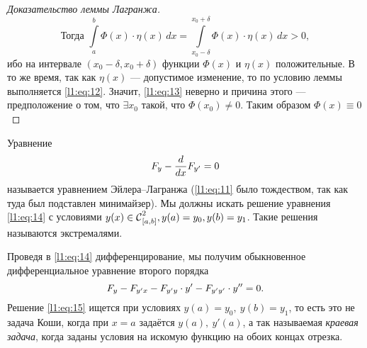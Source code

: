 \documentclass[12pt,a4paper,openany,fleqn]{book}
\newcommand{\Cf}{\ensuremath{\mathcal{C}}}
\newcommand{\Cfn}[2][]{\ensuremath{\Cf{\mathstrut}^{#2}_{#1}}}
\newcommand{\der}[2]{\ensuremath{\frac{d#1}{d#2}}}
\newcommand{\dd}{\ensuremath{d}}
\theoremstyle{definition}
\begin{document}
\begin{proof}[Доказательство леммы Лагранжа]
\begin{tikzpicture}[x=0.75pt,y=0.75pt,yscale=-1,xscale=1]
			
		\end{tikzpicture}
		
		\begin{equation}
			\label{l1:eq:13}
			\text{Тогда }\int\limits_a^b \Phi(x)\cdot\eta(x)\,\dd{x}=\int\limits_{x_0-\delta}^{x_0+\delta} \Phi(x)\cdot\eta(x)\,\dd{x}>0,
		\end{equation}
		ибо на интервале $(x_0-\delta,x_0+\delta)$ функции $\Phi(x)$ и $\eta(x)$ положительные. В то же время, так как $\eta(x)$ --- допустимое изменение, то по условию леммы выполняется \eqref{l1:eq:12}. Значит, \eqref{l1:eq:13} неверно и причина этого --- предположение о том, что $\exists x_0$ такой, что $\Phi(x_0)\neq0$. Таким образом $\Phi(x)\equiv0$ 
	\end{proof}
	
	Уравнение
	\begin{equation}
		\label{l1:eq:14}
		\hfill F_y-\der{}{x}F_{y'}=0\hfill
	\end{equation} 
	называется уравнением Эйлера--Лагранжа (\eqref{l1:eq:11} было тождеством, так как туда был подставлен минимайзер). Мы должны искать решение уравнения \eqref{l1:eq:14} с условиями $y(x)\in\Cfn[{[a,b]}]{2},\\ y(a)=y_0, y(b)=y_1$. Такие решения называются экстремалями.
	
	Проведя в \eqref{l1:eq:14} дифференцирование, мы получим обыкновенное дифференциальное уравнение второго порядка 
	\begin{equation}
		\label{l1:eq:15}
		\hfill F_y-F_{y'x}-F_{y'y}\cdot y'-F_{y'y'}\cdot y''=0.\hfill
	\end{equation}
	Решение \eqref{l1:eq:15} ищется при условиях $y(a)=y_0,\ y(b)=y_1$, то есть это не задача Коши, когда при $x=a$ задаётся $y(a),\ y'(a)$, а так называемая \emph{краевая задача}, когда заданы условия на искомую функцию на обоих концах отрезка.
	\vspace{0.2cm}
	
\end{document}
